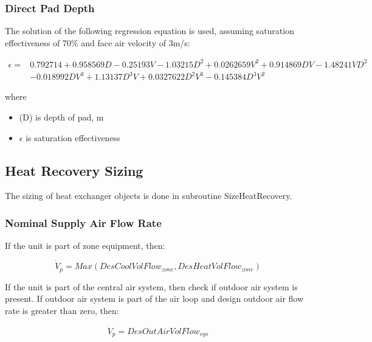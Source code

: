 \subsubsection{Direct Pad Depth}\label{direct-pad-depth}

The solution of the following regression equation is used, assuming saturation effectiveness of 70\% and face air velocity of 3m/s:

\begin{equation}
\begin{split}
\epsilon =& 0.792714 + 0.958569D - 0.25193V - 1.03215D^2 + 0.0262659V^2 + 0.914869DV - 1.48241VD^2 \\
&- 0.018992 D V^3 + 1.13137D^3V + 0.0327622 D^2V^3 - 0.145384D^3 V^2
\end{split}
\end{equation}

where

\begin{itemize}
\tightlist
\item
  (D) is depth of pad, m
\item
  \(\epsilon\) is saturation effectiveness
\end{itemize}

\subsection{Heat Recovery Sizing}\label{heat-recovery-sizing}

The sizing of heat exchanger objects is done in subroutine SizeHeatRecovery.

\subsubsection{Nominal Supply Air Flow Rate}\label{nominal-supply-air-flow-rate}

If the unit is part of zone equipment, then:

\begin{equation}
{\dot V_p} = Max\left( {DesCoolVolFlo{w_{zone}},DesHeatVolFlo{w_{zone}}} \right)
\end{equation}

If the unit is part of the central air system, then check if outdoor air system is present. If outdoor air system is part of the air loop and design outdoor air flow rate is greater than zero, then:

\begin{equation}
{\dot V_p} = DesOutAirVolFlo{w_{sys}}
\end{equation}

